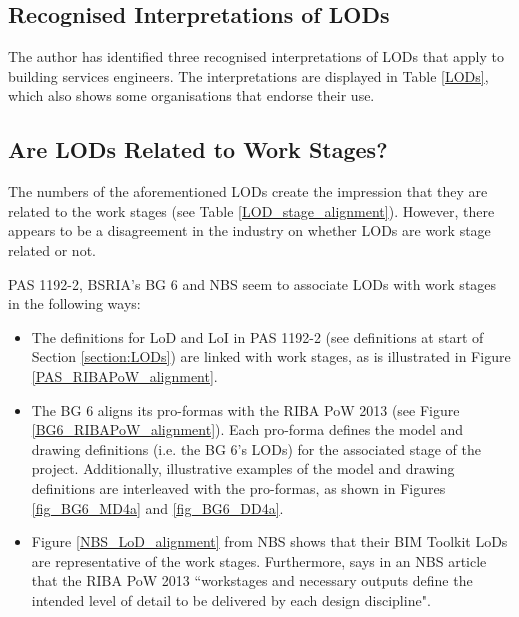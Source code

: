 


\subsection{Recognised Interpretations of LODs}

The author has identified three recognised interpretations of LODs that apply to building services engineers.
The interpretations are displayed in Table \ref{LODs}, which also shows some organisations that endorse their use.




\subsection{Are LODs Related to Work Stages?}

The numbers of the aforementioned LODs create the impression that they are related to the work stages (see Table \ref{LOD_stage_alignment}).
However, there appears to be a disagreement in the industry on whether LODs are work stage related or not.

PAS 1192-2, BSRIA's BG 6 and NBS seem to associate LODs with work stages in the following ways:
\begin{itemize}
	\item The definitions for LoD and LoI in PAS 1192-2  (see definitions at start of Section \ref{section:LODs}) are linked with work stages, as is illustrated in Figure \ref{PAS_RIBAPoW_alignment}.
	
	\item The BG 6 aligns its pro-formas with the RIBA PoW 2013 (see Figure \ref{BG6_RIBAPoW_alignment}).
	Each pro-forma defines the model and drawing definitions (i.e. the BG 6's LODs) for the associated stage of the project.
	Additionally, illustrative examples of the model and drawing definitions are interleaved with the pro-formas, as shown in Figures \ref{fig_BG6_MD4a} and \ref{fig_BG6_DD4a}.
	
	\item Figure \ref{NBS_LoD_alignment} from NBS shows that their BIM Toolkit LoDs are representative of the work stages.
	Furthermore, \cite{NBS_LoD_Kell} says in an NBS article that the RIBA PoW 2013 ``workstages and necessary outputs define the intended level of detail to be delivered by each design discipline".
\end{itemize}


